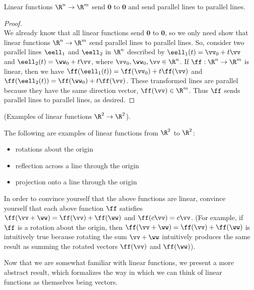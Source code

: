 \begin{theorem}
    Linear functions $\R^n \rightarrow \R^m$ send $\mathbf{0}$ to $\mathbf{0}$ and send parallel lines to parallel lines.
\end{theorem}

\begin{proof}
    \mbox{} \\ \indent
    We already know that all linear functions send $\mathbf{0}$ to $\mathbf{0}$, so we only need show that linear functions $\R^n \rightarrow \R^m$ send parallel lines to parallel lines. So, consider two parallel lines $\eell_1$ and $\eell_2$ in $\R^n$ described by $\eell_1(t) = \vv_0 + t\vv$ and $\eell_2(t) = \ww_0 + t\vv$, where $\vv_0, \ww_0, \vv \in \R^n$. If $\ff:\R^n \rightarrow \R^m$ is linear, then we have $\ff(\eell_1(t)) = \ff(\vv_0) + t \ff(\vv)$ and $\ff(\eell_2(t)) = \ff(\ww_0) + t \ff(\vv)$. These transformed lines are parallel because they have the same direction vector, $\ff(\vv) \in \R^m$. Thus $\ff$ sends parallel lines to parallel lines, as desired.
\end{proof}

\begin{remark}
    (Examples of linear functions $\R^2 \rightarrow \R^2$).
    
    The following are examples of linear functions from $\R^2$ to $\R^2$:
    
    \begin{itemize}
        \item rotations about the origin
        \item reflection across a line through the origin
        \item projection onto a line through the origin
    \end{itemize}
    
    In order to convince yourself that the above functions are linear, convince yourself that each above function $\ff$ satisfies $\ff(\vv + \ww) = \ff(\vv) + \ff(\ww)$ and $\ff(c \vv) = c \vv$. (For example, if $\ff$ is a rotation about the origin, then $\ff(\vv + \ww) = \ff(\vv) + \ff(\ww)$ is intuitively true because rotating the sum $\vv + \ww$ intuitively produces the same result as summing the rotated vectors $\ff(\vv)$ and $\ff(\ww)$).
\end{remark}

Now that we are somewhat familiar with linear functions, we present a more abstract result, which formalizes the way in which we can think of linear functions as themselves being vectors.

